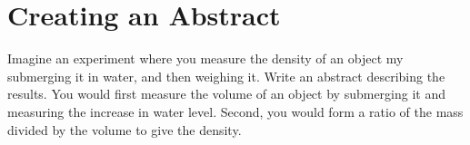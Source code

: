 \documentclass{article}
\begin{document}
\section{Creating an Abstract}

Imagine an experiment where you measure the density of an object my submerging it in water, and then weighing it.  Write an abstract describing the results.  You would first measure the volume of an object by submerging it and measuring the increase in water level.  Second, you would form a ratio of the mass divided by the volume to give the density.
\end{document}
